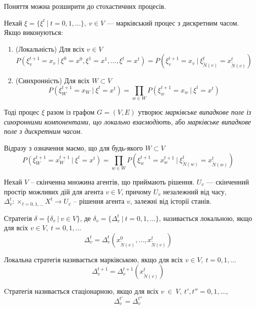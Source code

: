 \documentclass[oneside,draft,14pt]{extarticle}
\begin{document}
Поняття можна розширити до стохастичних процесів.
\begin{definition}
\label{def:mrftime}
Нехай \(\xi = \{\xi^t\ |\ t=0,1,\ldots\},\ v \in V \) — марківський процес з дискретним часом. 
Якщо виконуються:

\begin{enumerate}
    \item (Локальність) Для всіх \(v \in V\) \[P(\xi_v^{t+1} = x_v\ |\ \xi^0 = x^0, \xi^1 = x^1, \ldots, \xi^t = x^t) = P(\xi_v^{t+1} = x_v\ |\ \xi_{\tilde N(v)}^t = x_{\tilde N(v)}^t )\]
    \item (Синхронність) Для всіх \(W \subset V\) \[P(\xi^{t+1}_W = x_W\ |\ \xi^t = x^t) = \prod_{w \in W} P(\xi^{t+1}_w = x_w\ |\ \xi^t = x^t) \]
\end{enumerate}

Тоді процес \(\xi\) разом із графом \(G = (V, E)\) утворює \textit{марківське випадкове поле із синхронними компонентами, що локально взаємодіють}, або \textit{марківське випадкове поле з дискретним часом}. 
\end{definition}

Відразу з означення маємо, що для будь-якого \(W \subset V\)
\[P(\xi_W^{t+1} = x_W^{t+1}\ |\ \xi^t = x^t) = \prod_{w \in W} P(\xi_w^{t+1} = x_w^{t+1}\ |\ \xi_{\tilde{N}(w)}^t = x_{\tilde{N}(w)}^t)\]

Нехай \(V\) – скінченна множина агентів, що приймають рішення. \(U_v\) — скінченний простір можливих дій для агента \(v \in V\), причому \(U_v\) незалежний від часу, \(\Delta_v^t: \times_{t=0,1,\ldots}X^t \rightarrow U_v\) – рішення агента \(v\), залежні від історії станів. 

\begin{definition}
Стратегія \(\delta = \{\delta_v\ |\ v \in V\}\), де \(\delta_v = \{\Delta_v^t\ |\ t=0,1,\ldots\}\), називається локальною, якщо для всіх \(v \in V,\ t = 0, 1, \ldots\)
\[\Delta_v^t = \Delta_v^t(x_{\tilde{N}(v)}^0, \ldots, x_{\tilde{N}(v)}^t)\]
\end{definition}

\begin{definition}
Локальна стратегія називається марківською, якщо для всіх \(v \in V,\ t = 0, 1, \ldots\) 
\[\Delta_v^{t+1} = \Delta_v^{t+1}(x_{\tilde{N}(v)}^t)\]
\end{definition}

\begin{definition}
Cтратегія називається стаціонарною, якщо для всіх \(v~\in~V,\ t', t'' = 0, 1, \ldots,\)
\[\Delta_v^{t'} = \Delta_v^{t''}\]
\end{definition}
\end{document}
